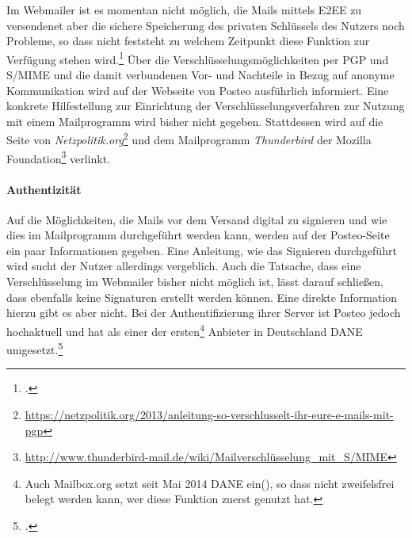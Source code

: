 \documentclass  [paper=a4,
				fontsize=12pt,
				listof=totoc,
				bibliography=totoc
				]{scrreprt}
\begin{document}
						Im Webmailer ist es momentan nicht möglich, die Mails mittels \ac{E2EE} zu versendenet aber die sichere Speicherung des privaten Schlüssels des Nutzers noch Probleme, so dass nicht feststeht zu welchem Zeitpunkt diese Funktion zur Verfügung stehen wird.\footcite[Vgl.][]{Posteo2013c}
						Über die Verschlüsselungsmöglichkeiten per \ac{PGP} und \ac{S/MIME} und die damit verbundenen Vor- und Nachteile in Bezug auf anonyme Kommunikation wird auf der Webseite von Posteo ausführlich informiert.
						Eine konkrete Hilfestellung zur Einrichtung der Verschlüsselungsverfahren zur Nutzung mit einem Mailprogramm wird bisher nicht gegeben.
						Stattdessen wird auf die Seite von \textit{Netzpolitik.org}\footnote{\url{https://netzpolitik.org/2013/anleitung-so-verschlusselt-ihr-eure-e-mails-mit-pgp}} und dem Mailprogramm \textit{Thunderbird} der Mozilla Foundation\footnote{\url{http://www.thunderbird-mail.de/wiki/Mailverschlüsselung_mit_S/MIME}} verlinkt.
					
					\paragraph{Authentizität}
						Auf die Möglichkeiten, die Mails vor dem Versand digital zu signieren und wie dies im Mailprogramm durchgeführt werden kann, werden auf der Posteo-Seite ein paar Informationen gegeben.
						Eine Anleitung, wie das Signieren durchgeführt wird sucht der Nutzer allerdings vergeblich.
						Auch die Tatsache, dass eine Verschlüsselung im Webmailer bisher nicht möglich ist, lässt darauf schließen, dass ebenfalls keine Signaturen erstellt werden können.
						Eine direkte Information hierzu gibt es aber nicht.
						Bei der Authentifizierung ihrer Server ist Posteo jedoch hochaktuell und hat als einer der ersten\footnote{Auch Mailbox.org setzt seit Mai 2014 \ac{DANE} ein(\cite[Vgl.][]{Mailbox2014a}), so dass nicht zweifelsfrei belegt werden kann, wer diese Funktion zuerst genutzt hat.} Anbieter in Deutschland \ac{DANE} umgesetzt.\footcite[Vgl.][]{Zivadino14-5}\medskip\\
					
\end{document}
